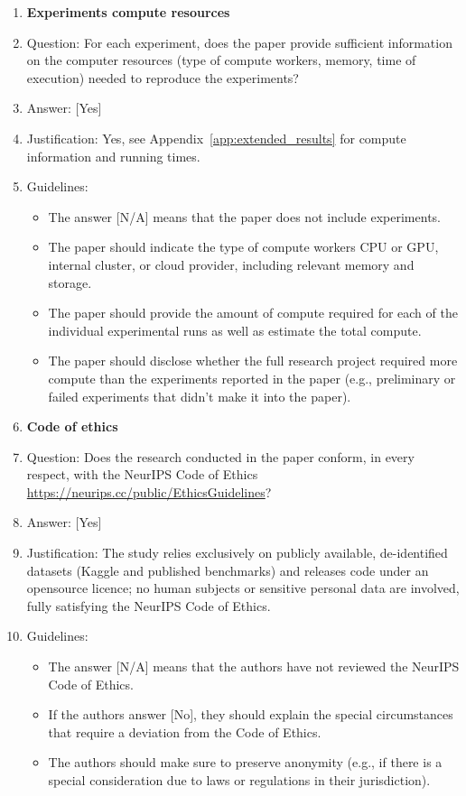 \documentclass{llmxive}
\providecommand{\answerYes}[1][]{[Yes]#1}
\providecommand{\answerNo}[1][]{[No]#1}
\providecommand{\answerNA}[1][]{[N/A]#1}
\begin{document}
\begin{enumerate}
\item {\bf Experiments compute resources}
    \item[] Question: For each experiment, does the paper provide sufficient information on the computer resources (type of compute workers, memory, time of execution) needed to reproduce the experiments?
    \item[] Answer: \answerYes{}
    \item[] Justification: Yes, see Appendix~\ref{app:extended_results} for compute information and running times.
    \item[] Guidelines:
    \begin{itemize}
        \item The answer \answerNA{} means that the paper does not include experiments.
        \item The paper should indicate the type of compute workers CPU or GPU, internal cluster, or cloud provider, including relevant memory and storage.
        \item The paper should provide the amount of compute required for each of the individual experimental runs as well as estimate the total compute. 
        \item The paper should disclose whether the full research project required more compute than the experiments reported in the paper (e.g., preliminary or failed experiments that didn't make it into the paper). 
    \end{itemize}
    
\item {\bf Code of ethics}
    \item[] Question: Does the research conducted in the paper conform, in every respect, with the NeurIPS Code of Ethics \url{https://neurips.cc/public/EthicsGuidelines}?
    \item[] Answer: \answerYes{}
    \item[] Justification: The study relies exclusively on publicly available, de-identified datasets
(Kaggle and published benchmarks) and releases code under an opensource licence; no human subjects or sensitive personal data are involved, fully satisfying
the NeurIPS Code of Ethics.
    \item[] Guidelines:
    \begin{itemize}
        \item The answer \answerNA{} means that the authors have not reviewed the NeurIPS Code of Ethics.
        \item If the authors answer \answerNo, they should explain the special circumstances that require a deviation from the Code of Ethics.
        \item The authors should make sure to preserve anonymity (e.g., if there is a special consideration due to laws or regulations in their jurisdiction).
    \end{itemize}



\end{enumerate}
\end{document}
